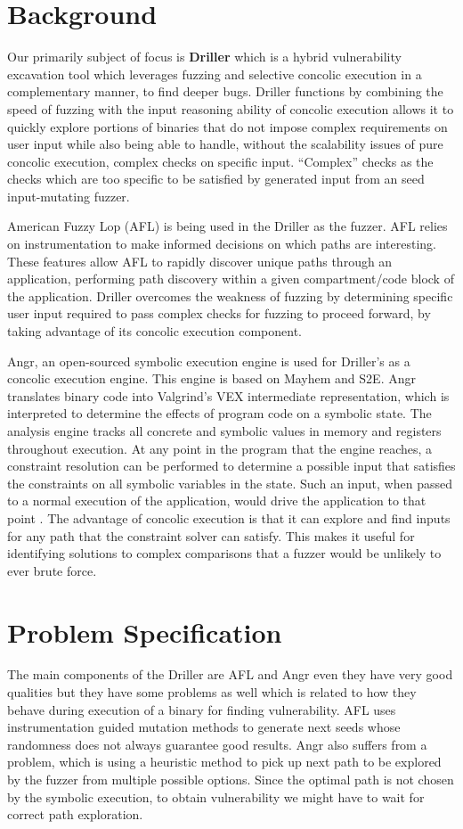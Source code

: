 \documentclass[a4paper, 11pt]{article}
\begin{document}
\section*{Background}
Our primarily subject of focus is \textbf{Driller }which is a hybrid vulnerability excavation tool which leverages fuzzing and selective concolic execution in a complementary manner, to find deeper bugs. Driller functions by combining the speed of fuzzing with the input reasoning ability of concolic execution allows it to quickly explore portions of binaries that do not impose complex requirements on user input while also being able to handle, without the scalability issues of pure concolic execution, complex checks on specific input. ``Complex'' checks as the checks which are too specific to be  satisfied by generated input from an seed input-mutating fuzzer\cite{svmguide}.

American Fuzzy Lop (AFL) is being used in the Driller as the fuzzer. AFL relies on instrumentation to make informed decisions on which paths are interesting. These features allow AFL to rapidly discover unique paths through an application, performing path discovery within a given compartment/code block of the application. Driller overcomes the weakness of fuzzing by determining specific user input required to pass complex checks for fuzzing to proceed forward, by taking advantage of its concolic execution component.

Angr, an open-sourced symbolic execution engine is used for Driller’s as a concolic execution engine. This engine is based on Mayhem and S2E. Angr translates binary code into Valgrind’s VEX intermediate representation, which is interpreted to determine the effects of program code on a symbolic state. The analysis engine tracks all concrete and symbolic values in memory and registers throughout execution. At any point in the program that the engine reaches, a constraint resolution can be performed to determine a possible input that satisfies the constraints on all symbolic variables in the state. Such an input, when passed to a normal execution of the application, would drive the application to that point \cite{angr}. The advantage of concolic execution is that it can explore and find inputs for any path that the constraint solver can satisfy. This makes it useful for identifying solutions to complex comparisons that a fuzzer would be unlikely to ever brute force.\\

\section*{Problem Specification}
The main components of the Driller are AFL and Angr even they have very good qualities but they have some problems as well which is related to how they behave during execution of a binary for finding vulnerability. AFL uses instrumentation guided mutation methods to generate next seeds whose randomness does not always guarantee good results. Angr also suffers from a problem, which is using a heuristic method to pick up next path to be explored by the fuzzer from multiple possible options. Since the optimal path is not chosen by the symbolic execution, to obtain vulnerability we might have to wait for correct path exploration. 
\end{document}
